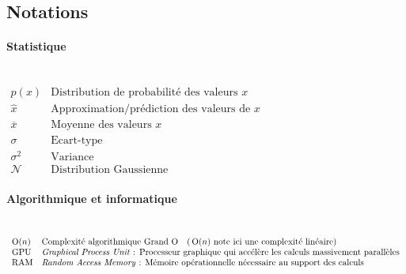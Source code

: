 {}

\vspace*{-1cm}
\begin{flushright}
\section*{\fontsize{20pt}{20pt}\selectfont\textnormal{Notations}}
\end{flushright}
\vspace{2cm}

\fancyhf{}
\lfoot[\fancyplain{}{}]
{\fancyplain{}{}}
\cfoot[\fancyplain{}{\thepage}]
{\fancyplain{}{\thepage}}
\rfoot[\fancyplain{}{}]
{\fancyplain{}{\scriptsize}}


\paragraph{Statistique}\mbox{} \\
$
\begin{array}{ll}
	{p(x)} & {\text {Distribution de probabilité des valeurs } x} \\
	{\hat x} & {\text {Approximation/prédiction des valeurs de } x} \\
	{\overline x} & {\text {Moyenne des valeurs } x} \\
	{\sigma} & {\text {Ecart-type}} \\
	{\sigma^{2}} & {\text {Variance}} \\
	{\mathcal{N}} & {\text {Distribution Gaussienne}}
\end{array}
$

\paragraph{Algorithmique et informatique}\mbox{} \\
$
\begin{array}{ll}
	{\operatorname{O}(n)} & {\text {Complexité algorithmique Grand O \ \ (}\operatorname{O}(n)\text { note ici une complexité linéaire)}} \\
	{\text{GPU}} & {\text{\textit{Graphical Process Unit} : Processeur graphique qui accélère les calculs massivement parallèles}} \\
	{\text{RAM}} & {\text{\textit{Random Access Memory} : Mémoire opérationnelle nécessaire au support des calculs}}
\end{array}
$


